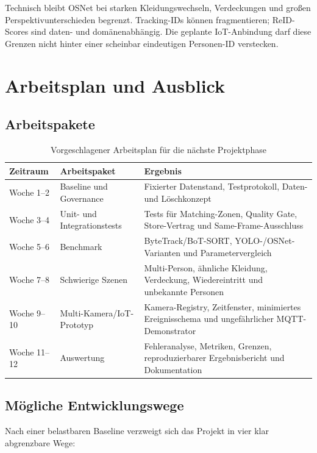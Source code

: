 Technisch bleibt OSNet bei starken Kleidungswechseln, Verdeckungen und großen
Perspektivunterschieden begrenzt. Tracking-IDs können fragmentieren; ReID-Scores
sind daten- und domänenabhängig. Die geplante IoT-Anbindung darf diese Grenzen
nicht hinter einer scheinbar eindeutigen Personen-ID verstecken.


\section{Arbeitsplan und Ausblick}

\subsection{Arbeitspakete}

\begin{table}[H]
  \centering
  \small
  \caption{Vorgeschlagener Arbeitsplan für die nächste Projektphase}
  \label{tab:plan}
  \begin{tabularx}{\textwidth}{L{18mm}L{25mm}Y}
    \toprule
    \textbf{Zeitraum} & \textbf{Arbeitspaket} & \textbf{Ergebnis} \\
    \midrule
    Woche 1--2 & Baseline und Governance & Fixierter Datenstand, Testprotokoll, Daten- und Löschkonzept \\
    Woche 3--4 & Unit- und Integrationstests & Tests für Matching-Zonen, Quality Gate, Store-Vertrag und Same-Frame-Ausschluss \\
    Woche 5--6 & Benchmark & ByteTrack/BoT-SORT, YOLO-/OSNet-Varianten und Parametervergleich \\
    Woche 7--8 & Schwierige Szenen & Multi-Person, ähnliche Kleidung, Verdeckung, Wiedereintritt und unbekannte Personen \\
    Woche 9--10 & Multi-Kamera/IoT-Prototyp & Kamera-Registry, Zeitfenster, minimiertes Ereignisschema und ungefährlicher MQTT-Demonstrator \\
    Woche 11--12 & Auswertung & Fehleranalyse, Metriken, Grenzen, reproduzierbarer Ergebnisbericht und Dokumentation \\
    \bottomrule
  \end{tabularx}
\end{table}

\subsection{Mögliche Entwicklungswege}

Nach einer belastbaren Baseline verzweigt sich das Projekt in vier klar
abgrenzbare Wege:

